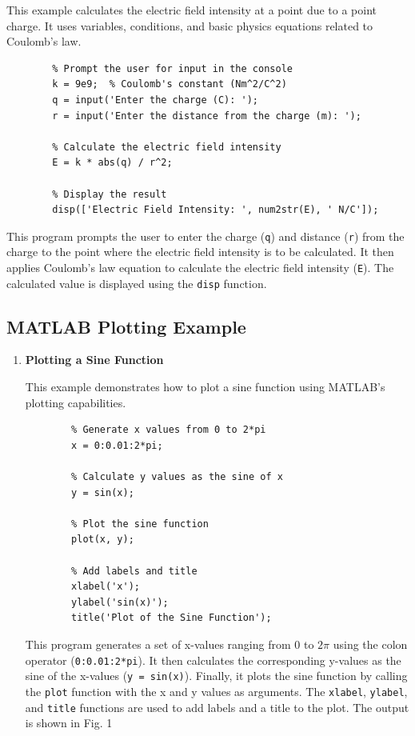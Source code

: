 \documentclass[
11pt, %
a4paper, %
oneside, %
headinclude,footinclude, %
BCOR5mm, %
]{scrartcl}
\begin{document}
\begin{enumerate}
	This example calculates the electric field intensity at a point due to a point charge. It uses variables, conditions, and basic physics equations related to Coulomb's law.
	
	\begin{verbatim}
		% Prompt the user for input in the console
		k = 9e9;  % Coulomb's constant (Nm^2/C^2)
		q = input('Enter the charge (C): ');
		r = input('Enter the distance from the charge (m): ');
		
		% Calculate the electric field intensity
		E = k * abs(q) / r^2;
		
		% Display the result
		disp(['Electric Field Intensity: ', num2str(E), ' N/C']);
	\end{verbatim}
	
	This program prompts the user to enter the charge (\texttt{q}) and distance (\texttt{r}) from the charge to the point where the electric field intensity is to be calculated. It then applies Coulomb's law equation to calculate the electric field intensity (\texttt{E}). The calculated value is displayed using the \texttt{disp} function.
	
\end{enumerate}

\subsection{MATLAB Plotting Example}

\begin{enumerate}
	
	\item \textbf{Plotting a Sine Function}
	
	This example demonstrates how to plot a sine function using MATLAB's plotting capabilities.
	
	\begin{verbatim}
		% Generate x values from 0 to 2*pi
		x = 0:0.01:2*pi;
		
		% Calculate y values as the sine of x
		y = sin(x);
		
		% Plot the sine function
		plot(x, y);
		
		% Add labels and title
		xlabel('x');
		ylabel('sin(x)');
		title('Plot of the Sine Function');
	\end{verbatim}
	
	This program generates a set of x-values ranging from 0 to $2\pi$ using the colon operator (\texttt{0:0.01:2*pi}). It then calculates the corresponding y-values as the sine of the x-values (\texttt{y = sin(x)}). Finally, it plots the sine function by calling the \texttt{plot} function with the x and y values as arguments. The \texttt{xlabel}, \texttt{ylabel}, and \texttt{title} functions are used to add labels and a title to the plot. The output is shown in Fig. 1
	
\end{enumerate}
\end{document}
